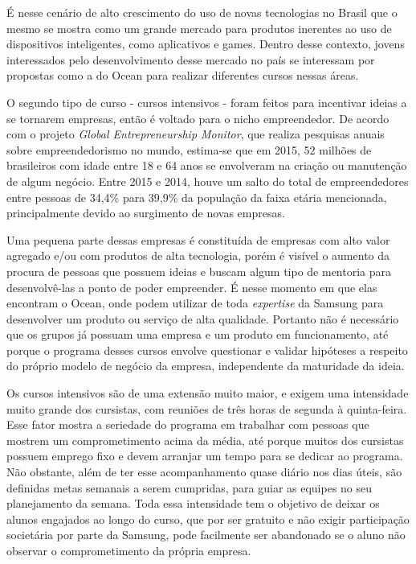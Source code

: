 É nesse cenário de alto crescimento do uso de novas tecnologias no Brasil que o mesmo se mostra como um grande mercado para produtos inerentes ao uso de dispositivos inteligentes, como aplicativos e games. Dentro desse contexto, jovens interessados pelo desenvolvimento desse mercado no país se interessam por propostas como a do Ocean para realizar diferentes cursos nessas áreas.
 
O segundo tipo de curso - cursos intensivos - foram feitos para incentivar ideias a se tornarem empresas, então é voltado para o nicho empreendedor. De acordo com o projeto \textit{Global Entrepreneurship Monitor}, que realiza pesquisas anuais sobre empreendedorismo no mundo, estima-se que em 2015, 52 milhões de brasileiros com idade entre 18 e 64 anos se envolveram na criação ou manutenção de algum negócio. Entre 2015 e 2014, houve um salto do total de empreendedores entre pessoas de 34,4\% para 39,9\% da população da faixa etária mencionada, principalmente devido ao surgimento de novas empresas. \cite{GEM}

Uma pequena parte dessas empresas é constituída de empresas com alto valor agregado e/ou com produtos de alta tecnologia, porém é visível o aumento da procura de pessoas que possuem ideias e buscam algum tipo de mentoria para desenvolvê-las a ponto de poder empreender. É nesse momento em que elas encontram o Ocean, onde podem utilizar de toda \textit{expertise} da Samsung para desenvolver um produto ou serviço de alta qualidade. Portanto não é necessário que os grupos já possuam uma empresa e um produto em funcionamento, até porque o programa desses cursos envolve questionar e validar hipóteses a respeito do próprio modelo de negócio da empresa, independente da maturidade da ideia. 

Os cursos intensivos são de uma extensão muito maior, e exigem uma intensidade muito grande dos cursistas, com reuniões de três horas de segunda à quinta-feira. Esse fator mostra a seriedade do programa em trabalhar com pessoas que mostrem um comprometimento acima da média, até porque muitos dos cursistas possuem emprego fixo e devem arranjar um tempo para se dedicar ao programa. Não obstante, além de ter esse acompanhamento quase diário nos dias úteis, são definidas metas semanais a serem cumpridas, para guiar as equipes no seu planejamento da semana. Toda essa intensidade tem o objetivo de deixar os alunos engajados ao longo do curso, que por ser gratuito e não exigir participação societária por parte da Samsung, pode facilmente ser abandonado se o aluno não observar o comprometimento da própria empresa.